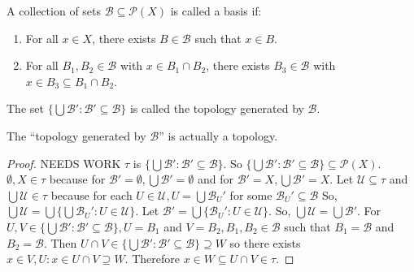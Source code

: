 \documentclass{article}
\begin{document}
	\begin{definition}
		A collection of sets \(\mathcal{B}\subseteq\mathcal{P}(X)\) is
		called a basis if:
		\begin{enumerate}
			\item For all \(x\in X\), there exists \(B\in\mathcal{B}\) such that
			\(x\in B\).
			\item  For all \(B_1,B_2 \in \mathcal{B}\) with \(x \in B_1 \cap B_2\), there exists \(B_3 \in \mathcal{B}\) with
			\(x\in B_3 \subseteq B_1 \cap B_2\).
		\end{enumerate}
	  The set \(\{\bigcup\mathcal{B}':\mathcal{B}'\subseteq\mathcal{B}\}\)
		is called the topology generated by \(\mathcal{B}\).
	\end{definition}

	\begin{theorem}
		The ``topology generated by \(\mathcal{B}\)'' is actually a topology.
	\end{theorem}
	\begin{proof} NEEDS WORK\newline
	$\tau$ is $\lbrace \bigcup \mathcal{B}' : \mathcal{B}' \subseteq \mathcal{B} \rbrace$. So $\lbrace \bigcup \mathcal{B}' : \mathcal{B}' \subseteq \mathcal{B} \rbrace \subseteq \mathcal{P}(X)$. $\emptyset, X \in \tau$ because for $\mathcal{B}' = \emptyset, \bigcup \mathcal{B}' = \emptyset$ and for $\mathcal{B}' = X, \bigcup \mathcal{B}' = X$. Let $\mathcal{U} \subseteq \tau$ and $\bigcup \mathcal{U} \in \tau$ because for each $U \in \mathcal{U}, U = \bigcup \mathcal{B}_{U}'$ for some $\mathcal{B}_{U}' \subseteq \mathcal{B}$ So, $\bigcup \mathcal{U} = \bigcup \lbrace \bigcup \mathcal{B}_{U}' : U \in \mathcal{U} \rbrace$. Let $\mathcal{B}' = \bigcup \lbrace \mathcal{B}_{U}' : U \in \mathcal{U} \rbrace.$ So, $\bigcup \mathcal{U} = \bigcup \mathcal{B}'.$ \newline For $U, V \in \lbrace \bigcup \mathcal{B}' : \mathcal{B}' \subseteq \mathcal{B} \rbrace, U = B_1$ and $V = B_2, B_1, B_2 \in \mathcal{B}$ such that $B_1 = \mathcal{B}$ and $B_2 = \mathcal{B}$. Then $U \cap V \in \lbrace \bigcup \mathcal{B}' : \mathcal{B}' \subseteq \mathcal{B} \rbrace \supseteq W$ so there exists $x \in V, U : x \in U \cap V \supseteq W$. Therefore $x \in W \subseteq U \cap V \in \tau$.
	\end{proof}
\end{document}
